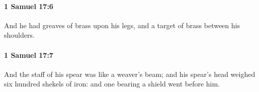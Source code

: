 		\paragraph{1 Samuel 17:6} %
			\label{1SAMUEL-17-6}

			And he had greaves of brass upon his legs, and a target of brass between his shoulders.


		\paragraph{1 Samuel 17:7} %
			\label{1SAMUEL-17-7}

			And the staff of his spear was like a weaver’s beam; and his spear’s head weighed six hundred shekels of iron: and one bearing a shield went before him.


